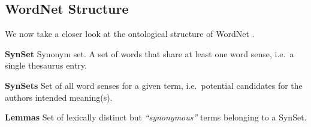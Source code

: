 


\subsection{WordNet Structure}
We now take a closer look at the ontological structure of WordNet \cite{Miller:1995:WLD:219717.219748}.

\vspace{5pt}

\noindent \textbf{SynSet} Synonym set. A set of words that share at least one word sense, i.e.\ a single thesaurus entry.

\vspace{5pt}

\noindent \textbf{SynSets} Set of all word senses for a given term, i.e.\ potential candidates for the authors intended meaning(s). 

\vspace{5pt}

\noindent \textbf{Lemmas} Set of lexically distinct but \textit{``synonymous''} terms belonging to a SynSet.

\vspace{5pt}




